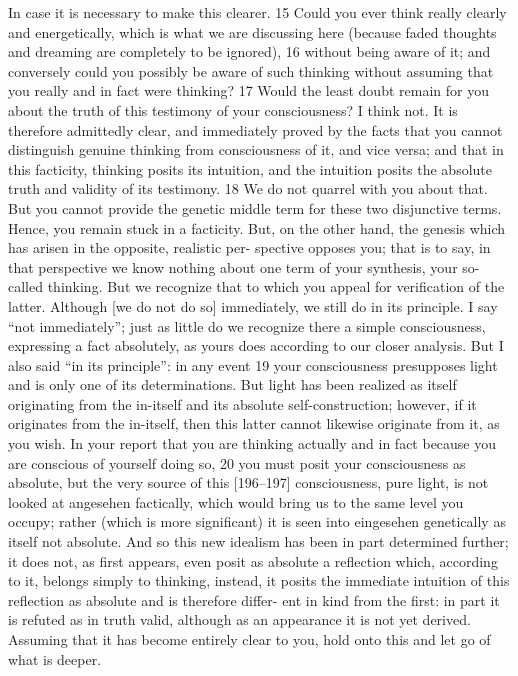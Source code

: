In case it is necessary to make this clearer.
15 Could you ever think really
clearly and energetically, which is what we are discussing here (because faded
thoughts and dreaming are completely to be ignored), 16 without being aware
of it; and conversely could you possibly be aware of such thinking without
assuming that you really and in fact were thinking? 17 Would the least doubt
remain for you about the truth of this testimony of your consciousness? I
think not.
It is therefore admittedly clear, and immediately proved by the
facts that you cannot distinguish genuine thinking from consciousness of it,
and vice versa; and that in this facticity, thinking posits its intuition, and the
intuition posits the absolute truth and validity of its testimony.
18 We do not
quarrel with you about that.
But you cannot provide the genetic middle term
for these two disjunctive terms.
Hence, you remain stuck in a facticity.
But,
on the other hand, the genesis which has arisen in the opposite, realistic per-
spective opposes you; that is to say, in that perspective we know nothing
about one term of your synthesis, your so-called thinking.
But we recognize
that to which you appeal for verification of the latter.
Although [we do not
do so] immediately, we still do in its principle.
I say “not immediately”; just as
little do we recognize there a simple consciousness, expressing a fact
absolutely, as yours does according to our closer analysis.
But I also said “in
its principle”: in any event 19 your consciousness presupposes light and is only
one of its determinations.
But light has been realized as itself originating
from the in-itself and its absolute self-construction; however, if it originates
from the in-itself, then this latter cannot likewise originate from it, as you
wish.
In your report that you are thinking actually and in fact because you are
conscious of yourself doing so, 20 you must posit your consciousness as
absolute, but the very source of this [196–197] consciousness, pure light, is
not looked at {angesehen} factically, which would bring us to the same level
you occupy; rather (which is more significant) it is seen into {eingesehen}
genetically as itself not absolute.
And so this new idealism has been in part
determined further; it does not, as first appears, even posit as absolute a
reflection which, according to it, belongs simply to thinking, instead, it posits
the immediate intuition of this reflection as absolute and is therefore differ-
ent in kind from the first: in part it is refuted as in truth valid, although as an
appearance it is not yet derived.
Assuming that it has become entirely clear
to you, hold onto this and let go of what is deeper.

